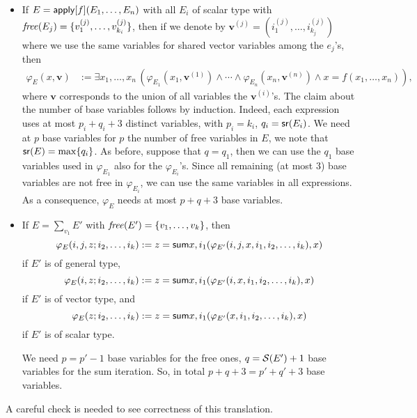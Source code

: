 \begin{itemize}
\item If $E = \mathsf{apply}[f](E_1,\ldots,E_n)$ with all $E_i$ of scalar type with $\operatorname{\mathit{free}}(E_j)=\{v_1^{(j)},\ldots,v_{k_i}^{(j)}\}$, then if we denote by
$\mathbf{v}^{(j)}=(i_1^{(j)},\ldots,i_{k_j}^{(j)})$ where we use the same variables for shared vector variables among the $e_j$'s, then
\begin{align*}
\varphi_E(x,\mathbf{v})&:=\exists x_1,\ldots,x_n\, (\varphi_{E_1}(x_1,\mathbf{v}^{(1)})\land \cdots \land \varphi_{E_n}(x_n,\mathbf{v}^{(n)})\land x=f(x_1,\ldots,x_n)),
\end{align*}
where $\mathbf{v}$ corresponds to the union of all variables the $\mathbf{v}^{(i)}$'s. The claim about the number of base variables follows by induction. Indeed, each expression uses at most $p_i+q_i+3$ distinct variables, with $p_i=k_i$, $q_i=\mathsf{sr}(E_i)$. We need at $p$ base variables for $p$ the number of free variables in $E$, we note that $\mathsf{sr}(E)=\max\{q_i\}$. As before, suppose that $q=q_1$,  then we can use the $q_1$ base variables used in $\varphi_{E_1}$ also for the $\varphi_{E_i}$'s. Since all remaining (at most $3$) base variables are not free in $\varphi_{E_i}$, we can use the same variables in all expressions. As a consequence, $\varphi_E$ needs at most $p+q+3$ base variables.


\item If $E = \sum_{v_1} E'$ with $\operatorname{\mathit{free}}(E')=\{v_1,\ldots,v_k\}$, then 
$$\varphi_E(i,j,z;i_2,\ldots,i_k):= z= \mathsf{sum} x,i_1 (\varphi_{E'}(i,j,x,i_1,i_2,\ldots,i_k),x)
$$ if $E'$ is of general type,
$$\varphi_E(i,z;i_2,\ldots,i_k):= z= \mathsf{sum} x,i_1 (\varphi_{E'}(i,x,i_1,i_2,\ldots,i_k),x)
$$ if $E'$ is of vector type, and
$$\varphi_E(z;i_2,\ldots,i_k):= z= \mathsf{sum} x,i_1 (\varphi_{E'}(x,i_1,i_2,\ldots,i_k),x)
$$ if $E'$ is of scalar type.

We need $p=p'-1$ base variables for the free ones, $q=\mathcal{S}(E')+1$ base variables for the sum iteration. So, in total
$p+q+3=p'+q'+3$ base variables.

\end{itemize}
\begin{todo}
A careful check is needed to see correctness of this translation.
\end{todo}

